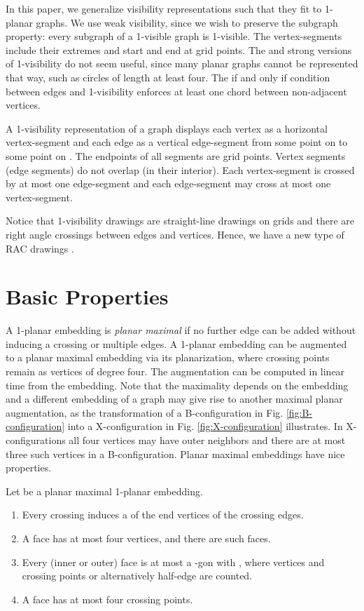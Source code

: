 \documentclass[runningheads]{llncs}
\begin{document}
In this paper, we generalize visibility representations such that
they fit to 1-planar graphs. We use weak visibility, since we wish
to preserve the subgraph property: every subgraph of a 1-visible
graph is 1-visible. The vertex-segments include their extremes and
start and end at grid points. The  and strong versions of
1-visibility do not seem useful, since many planar graphs cannot be
represented that way, such as circles of length at least four. The
if and only if condition between edges and 1-visibility enforces at
least one chord between non-adjacent vertices.

\begin{definition}
A 1-visibility representation of a graph  displays each
vertex  as a horizontal vertex-segment  and each edge
 as a vertical edge-segment  from some point on
 to some point on .  The endpoints of all
segments are grid points. Vertex segments (edge segments) do not
overlap (in their interior).  Each vertex-segment is crossed by at
most one edge-segment and each edge-segment  may cross at most one
vertex-segment.
\end{definition}

Notice that 1-visibility drawings are straight-line drawings on
grids and there are right angle crossings between edges and
vertices. Hence, we have a new type of  RAC drawings
\cite{del-dgrac-11,el-racg1p-13}.



\section{Basic Properties}


A 1-planar embedding is \textit{planar maximal} if no further edge
can be added without inducing a crossing or multiple edges.  A
1-planar embedding can be augmented to a planar maximal embedding
via its planarization, where crossing points remain as vertices of
degree four. The augmentation can be computed in linear time from
the embedding. Note that the maximality depends on the embedding and
a different embedding of a graph may give rise to another maximal
planar augmentation, as the transformation of a B-configuration in
Fig. \ref{fig:B-configuration} into a X-configuration in Fig.
\ref{fig:X-configuration} illustrates. In X-configurations all four
vertices may have outer neighbors and there are at most three such
vertices in a B-configuration. Planar maximal embeddings have nice
properties.


\begin{lemma}
Let  be a planar maximal 1-planar embedding.
\begin{enumerate}
  \item Every crossing induces a  of the end vertices of the crossing edges.
  \item A face has  at most four  vertices, and there are
  such faces.
  \item Every (inner or outer) face is at most a -gon with ,
  where vertices and crossing points or alternatively half-edge
   are counted.
   \item A face has at most four crossing points.
\end{enumerate}
\end{lemma}
\end{document}
